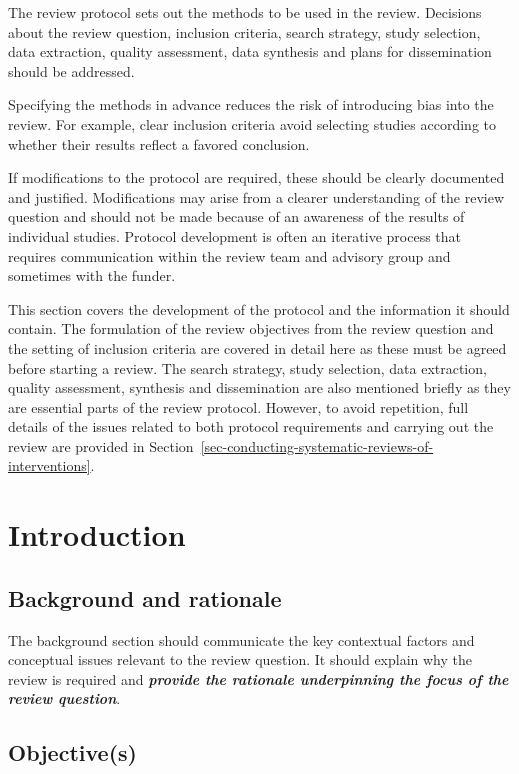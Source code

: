 \documentclass[
  11pt,
  a4paper,
  DIV=11,
  numbers=noendperiod]{scrreprt}
\begin{document}
The review protocol sets out the methods to be used in the review.
Decisions about the review question, inclusion criteria, search
strategy, study selection, data extraction, quality assessment, data
synthesis and plans for dissemination should be addressed.

Specifying the methods in advance reduces the risk of introducing bias
into the review. For example, clear inclusion criteria avoid selecting
studies according to whether their results reflect a favored conclusion.

If modifications to the protocol are required, these should be clearly
documented and justified. Modifications may arise from a clearer
understanding of the review question and should not be made because of
an awareness of the results of individual studies. Protocol development
is often an iterative process that requires communication within the
review team and advisory group and sometimes with the funder.

This section covers the development of the protocol and the information
it should contain. The formulation of the review objectives from the
review question and the setting of inclusion criteria are covered in
detail here as these must be agreed before starting a review. The search
strategy, study selection, data extraction, quality assessment,
synthesis and dissemination are also mentioned briefly as they are
essential parts of the review protocol. However, to avoid repetition,
full details of the issues related to both protocol requirements and
carrying out the review are provided in
Section~\ref{sec-conducting-systematic-reviews-of-interventions}.

\section{Introduction}\label{introduction-1}

\subsection{Background and rationale}\label{background-and-rationale}

The background section should communicate the key contextual factors and
conceptual issues relevant to the review question. It should explain why
the review is required and \textbf{\emph{provide the rationale
underpinning the focus of the review question}}.

\subsection{Objective(s)}\label{objectives}
\end{document}
